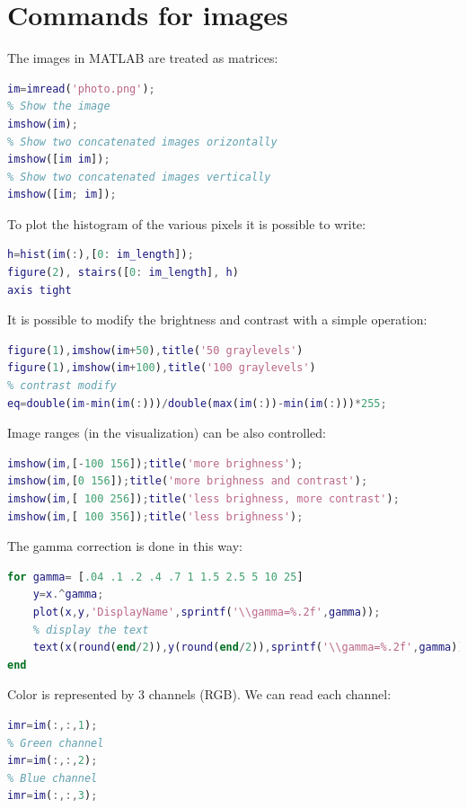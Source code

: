 \documentclass[12pt, a4paper]{report}
\newtheorem[style=M,bodystyle=\normalfont]{theorem}{Theorem}
\newtheorem[style=M,bodystyle=\normalfont]{corollary}{Corollary}
\newtheorem[style=M,bodystyle=\normalfont]{lemma}{Lemma}
\newtheorem[style=M,bodystyle=\normalfont]{definition}{Definition}
\begin{document}
    \section{Commands for images}
    The images in MATLAB are treated as matrices:
    \begin{lstlisting}[language=Matlab]
im=imread('photo.png');
% Show the image
imshow(im);
% Show two concatenated images orizontally
imshow([im im]);
% Show two concatenated images vertically
imshow([im; im]);
    \end{lstlisting}
    To plot the histogram of the various pixels it is possible to write: 
    \begin{lstlisting}[language=Matlab]
h=hist(im(:),[0: im_length]);
figure(2), stairs([0: im_length], h)
axis tight
    \end{lstlisting}
    It is possible to modify the brightness and contrast with a simple operation:
    \begin{lstlisting}[language=Matlab]
figure(1),imshow(im+50),title('50 graylevels')
figure(1),imshow(im+100),title('100 graylevels')
% contrast modify
eq=double(im-min(im(:)))/double(max(im(:))-min(im(:)))*255;
    \end{lstlisting}
    Image ranges (in the visualization) can be also controlled:
    \begin{lstlisting}[language=Matlab]
imshow(im,[-100 156]);title('more brighness');
imshow(im,[0 156]);title('more brighness and contrast');
imshow(im,[ 100 256]);title('less brighness, more contrast');
imshow(im,[ 100 356]);title('less brighness');
    \end{lstlisting}
    The gamma correction is done in this way: 
    \begin{lstlisting}[language=Matlab]
for gamma= [.04 .1 .2 .4 .7 1 1.5 2.5 5 10 25]
    y=x.^gamma;
    plot(x,y,'DisplayName',sprintf('\\gamma=%.2f',gamma));
    % display the text
    text(x(round(end/2)),y(round(end/2)),sprintf('\\gamma=%.2f',gamma));
end
    \end{lstlisting}
    Color is represented by 3 channels (RGB). We can read each channel:
    \begin{lstlisting}[language=Matlab]
% Red channel
imr=im(:,:,1);
% Green channel
imr=im(:,:,2);
% Blue channel
imr=im(:,:,3);
    \end{lstlisting}

    \newpage
\end{document}
